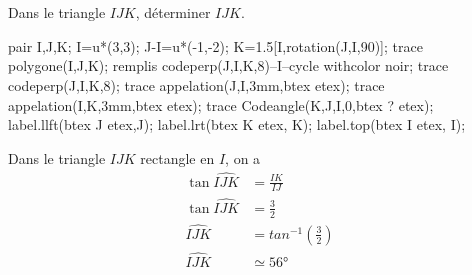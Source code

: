 \begin{methode*1}
    \exercice
    Dans le triangle $IJK$, déterminer $\widehat{IJK}$.
        
        \medskip        
        \begin{Geometrie}[CoinHD={(6.5u,5u)}]        
            pair I,J,K;
            I=u*(3,3);
            J-I=u*(-1,-2);
            K=1.5[I,rotation(J,I,90)];
            trace polygone(I,J,K);
            remplis codeperp(J,I,K,8)--I--cycle withcolor noir;
            trace codeperp(J,I,K,8);
            trace appelation(J,I,3mm,btex  etex);
            trace appelation(I,K,3mm,btex  etex);
            trace Codeangle(K,J,I,0,btex ? etex);
            label.llft(btex J etex,J);
            label.lrt(btex K etex, K);
            label.top(btex I etex, I);
        \end{Geometrie}
    \correction
     Dans le triangle $IJK$ rectangle en $I$, on a
        \begin{align*}
            \tan\widehat{IJK}&=\frac{IK}{IJ}\\
            \tan\widehat{IJK}&=\frac{3}{2}\\
            \widehat{IJK}&=tan^{-1}\left(\frac{3}{2}\right)\\
            \widehat{IJK}&\simeq\ang{56}
        \end{align*}
\end{methode*1}

